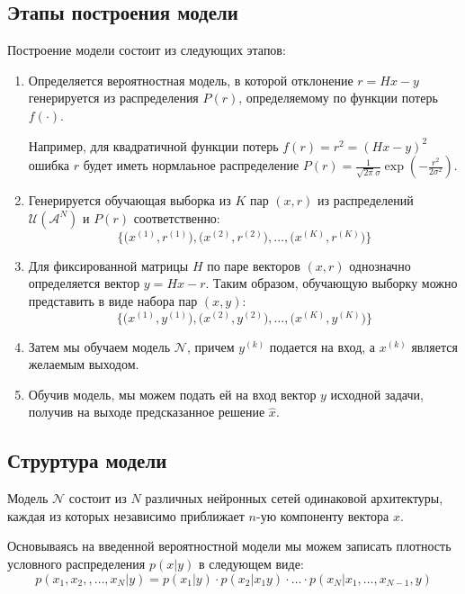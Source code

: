 \documentclass[12pt]{article}
\begin{document}
\subsection{Этапы построения модели}

Построение модели состоит из следующих этапов:

\begin{enumerate}
    \item Определяется вероятностная модель, в которой отклонение $r = Hx - y$ генерируется из распределения $P(r)$, определяемому по функции потерь $f(\cdot)$.

        Например, для квадратичной функции потерь $f(r) = r^2 = (Hx - y)^2$ ошибка $r$ будет иметь нормлаьное распределение $P(r) = \frac{1}{\sqrt{2 \pi}\sigma} \exp \left( -\frac{r^2}{2 \sigma^2} \right)$.

    \item Генерируется обучающая выборка из $K$ пар $(x, r)$ из распределений $\mathcal{U}(\mathcal{A}^N)$ и $P(r)$ соответственно:
        $$
        \bigg\{ \Big( x^{(1)}, r^{(1)} \Big), \Big( x^{(2)}, r^{(2)} \Big), \ldots, \Big( x^{(K)}, r^{(K)} \Big) \bigg\}
        $$
    
    \item Для фиксированной матрицы $H$ по паре векторов $(x, r)$ однозначно определяется вектор $y = Hx - r$. Таким образом, обучающую выборку можно представить в виде набора пар $(x, y)$:
        $$
        \bigg\{ \Big( x^{(1)}, y^{(1)} \Big), \Big( x^{(2)}, y^{(2)} \Big), \ldots, \Big( x^{(K)}, y^{(K)} \Big) \bigg\}
        $$
    
    \item Затем мы обучаем модель $\mathcal{N}$, причем $y^{(k)}$ подается на вход, а $x^{(k)}$ является желаемым выходом.
    
    \item Обучив модель, мы можем подать ей на вход вектор $y$ исходной задачи, получив на выходе предсказанное решение $\hat x$.
\end{enumerate}

\subsection{Струртура модели}
Модель $\mathcal{N}$ состоит из $N$ различных нейронных сетей одинаковой архитектуры, каждая из которых независимо приближает $n$-ую компоненту вектора $x$.

Основываясь на введенной вероятностной модели мы можем записать плотность условного распределения $p(x | y)$ в следующем виде:
    $$
    p(x_1, x_2, , \ldots, x_N | y) = p(x_1 | y) \cdot p(x_2 | x_1 y) \cdot \ldots \cdot p(x_N | x_1,  \ldots, x_{N-1},  y)
    $$
\end{document}
